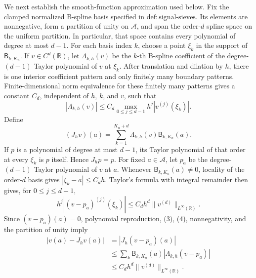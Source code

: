 We next establish the smooth-function approximation used below.  Fix the
clamped normalized B-spline basis specified in
\(\mathrm{def{:}signal\text{-}sieves}\).  Its elements are nonnegative,
form a partition of unity on \(\mathcal A\), and span the order-\(d\) spline
space on the uniform partition.  In particular, that space contains every
polynomial of degree at most \(d-1\).  For each basis index \(k\), choose a
point \(\xi_k\) in the support of \(\mathsf B_{k,K_n}\).  If
\(v\in C^d(\mathbb R)\), let \(\Lambda_{k,h}(v)\) be the \(k\)-th B-spline
coefficient of the degree-\((d-1)\) Taylor polynomial of \(v\) at \(\xi_k\).
After translation and dilation by \(h\), there is one interior coefficient
pattern and only finitely many boundary patterns.  Finite-dimensional norm
equivalence for these finitely many patterns gives a constant \(C_d\),
independent of \(h\), \(k\), and \(v\), such that
\[
 |\Lambda_{k,h}(v)|
 \le C_d\max_{0\le j\le d-1}h^j|v^{(j)}(\xi_k)|.                    \tag{3}
\]
Define
\[
 (J_hv)(a)=\sum_{k=1}^{K_n+d}
              \Lambda_{k,h}(v)\mathsf B_{k,K_n}(a).
\]
If \(p\) is a polynomial of degree at most \(d-1\), its Taylor polynomial
of that order at every \(\xi_k\) is \(p\) itself.  Hence \(J_hp=p\).
For fixed \(a\in\mathcal A\), let \(p_a\) be the degree-\((d-1)\) Taylor
polynomial of \(v\) at \(a\).  Whenever
\(\mathsf B_{k,K_n}(a)\ne0\), locality of the order-\(d\) basis gives
\(|\xi_k-a|\le C_dh\).  Taylor's formula with integral remainder then gives,
for \(0\le j\le d-1\),
\[
 h^j|(v-p_a)^{(j)}(\xi_k)|
 \le C_dh^d\|v^{(d)}\|_{L^\infty(\mathbb R)}.                     \tag{4}
\]
Since \((v-p_a)(a)=0\), polynomial reproduction, (3), (4), nonnegativity,
and the partition of unity imply
\[
 \begin{aligned}
 |v(a)-J_hv(a)|
 &=|J_h(v-p_a)(a)|\\
 &\le \sum_k\mathsf B_{k,K_n}(a)
          |\Lambda_{k,h}(v-p_a)|\\
 &\le C_dh^d\|v^{(d)}\|_{L^\infty(\mathbb R)}.                    \tag{5}
 \end{aligned}
\]

